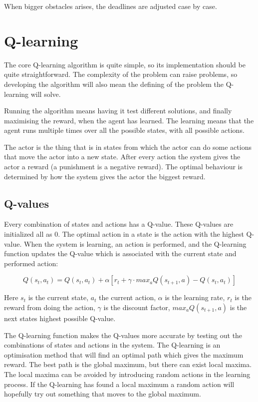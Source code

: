 \documentclass{article}
\begin{document}
When bigger obstacles arises, the deadlines are adjusted case by case.



\section{Q-learning}
The core Q-learning algorithm is quite simple, so its implementation should
be quite straightforward. The complexity of the problem can raise problems,
so developing the algorithm will also mean the defining of
the problem the Q-learning will solve.

Running the algorithm means having it test different solutions, and finally
maximising the reward, when the agent has learned. The learning means
that the agent runs multiple times over all the possible states,
with all possible actions.

The actor is the thing that is in states from which the actor can do some
actions that move the actor into a new state. After every action the
system gives the actor a reward (a punishment is a negative reward).
The optimal behaviour is determined by how the system gives the actor the
biggest reward.


\subsection{Q-values}
Every combination of states and actions has a Q-value. These Q-values are
initialized all as 0. The optimal action in a state is the action with the
highest Q-value. When the system is learning, an action is performed, and the
Q-learning function updates the Q-value which is associated with the current
state and performed action:

\[Q(s_t, a_t) = Q(s_t, a_t) + \alpha [ r_t + \gamma \cdot max_aQ(s_{t+1}, a)
- Q(s_t, a_t) ]\]

Here $s_t$ is the current state, $a_t$ the current action,
$\alpha$ is the learning rate, $r_t$ is the reward from doing the action,
$\gamma$ is the discount factor, $max_aQ(s_{t+1}, a)$ is the next states
highest possible Q-value.

The Q-learning function makes the Q-values more accurate by testing out
the combinations of states and actions in the system. The Q-learning is an
optimisation method that will find an optimal path which gives the maximum
reward. The best path is the global maximum, but there can exist local maxima.
The local maxima can be avoided by introducing random actions in the learning
process. If the Q-learning has found a local maximum a random action will
hopefully try out something that moves to the global maximum.
\end{document}
